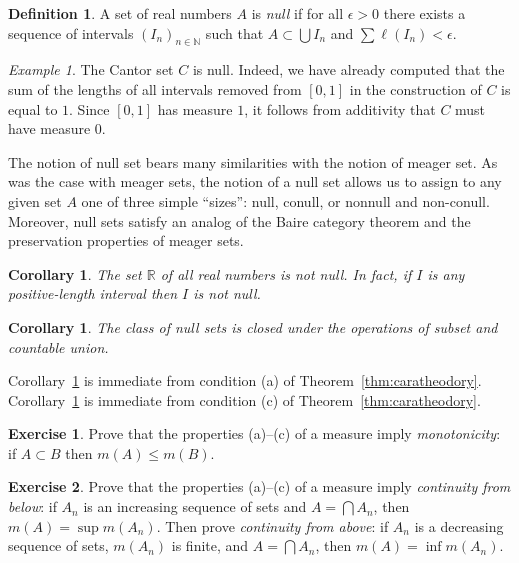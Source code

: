 \documentclass[11pt,oneside]{amsbook}
\newcommand{\N}{\mathbb N}
\newcommand{\R}{\mathbb R}
\theoremstyle{definition}
\newtheorem{exerc}{Exercise}[section]
\theoremstyle{plain}
\newtheorem{corollary}[theorem]{Corollary}
\theoremstyle{definition}
\newtheorem{definition}[theorem]{Definition}
\theoremstyle{remark}
\newtheorem{example}[theorem]{Example}
\numberwithin{equation}{section}
\numberwithin{figure}{section}
\begin{document}
\begin{definition}
  \label{defn:null}
  A set of real numbers $A$ is \emph{null} if for all $\epsilon>0$ there exists a sequence of intervals $(I_n)_{n\in\N}$ such that $A\subset\bigcup I_n$ and $\sum\ell(I_n)<\epsilon$.
\end{definition}

\begin{example}
  The Cantor set $C$ is null. Indeed, we have already computed that the sum of the lengths of all intervals removed from $[0,1]$ in the construction of $C$ is equal to $1$. Since $[0,1]$ has measure $1$, it follows from additivity that $C$ must have measure $0$.
\end{example}

The notion of null set bears many similarities with the notion of meager set. As was the case with meager sets, the notion of a null set allows us to assign to any given set $A$ one of three simple ``sizes'': null, conull, or nonnull and non-conull. Moreover, null sets satisfy an analog of the Baire category theorem and the preservation properties of meager sets.

\begin{corollary}
  \label{cor:interval-nonnull}
  The set $\R$ of all real numbers is not null. In fact, if $I$ is any positive-length interval then $I$ is not null.
\end{corollary}

\begin{corollary}
  \label{cor:null-pres}
  The class of null sets is closed under the operations of subset and countable union.
\end{corollary}

Corollary~\ref{cor:interval-nonnull} is immediate from condition (a) of Theorem~\ref{thm:caratheodory}. Corollary~\ref{cor:null-pres} is immediate from condition (c) of Theorem~\ref{thm:caratheodory}.

\begin{exerc}
  Prove that the properties (a)--(c) of a measure imply \emph{monotonicity}: if $A\subset B$ then $m(A)\leq m(B)$.
\end{exerc}

\begin{exerc}
  \label{exerc:continuity-above}
  Prove that the properties (a)--(c) of a measure imply \emph{continuity from below}: if $A_n$ is an increasing sequence of sets and $A=\bigcap A_n$, then $m(A)=\sup m(A_n)$. Then prove \emph{continuity from above}: if $A_n$ is a decreasing sequence of sets, $m(A_n)$ is finite, and $A=\bigcap A_n$, then $m(A)=\inf m(A_n)$.
\end{exerc}
\end{document}
